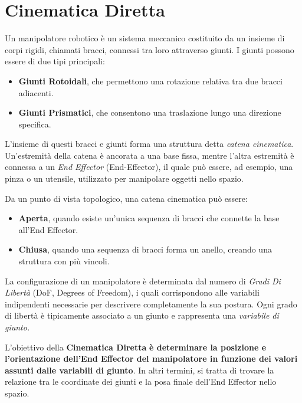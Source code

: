 \documentclass[11pt, a4paper]{report}
\begin{document}
\newpage
\section{Cinematica Diretta}
Un manipolatore robotico è un sistema meccanico costituito da un insieme di corpi rigidi, chiamati bracci, connessi tra loro attraverso giunti. I giunti possono essere di due tipi principali:
\begin{itemize}
    \item \textbf{Giunti Rotoidali}, che permettono una rotazione relativa tra due bracci adiacenti.
    \item \textbf{Giunti Prismatici}, che consentono una traslazione lungo una direzione specifica.
\end{itemize}
L'insieme di questi bracci e giunti forma una struttura detta \emph{catena cinematica}. Un'estremità della catena è ancorata a una base fissa, mentre l'altra estremità è connessa a un \emph{End Effector} (End-Effector), il quale può essere, ad esempio, una pinza o un utensile, utilizzato per manipolare oggetti nello spazio.

Da un punto di vista topologico, una catena cinematica può essere:
\begin{itemize}
    \item \textbf{Aperta}, quando esiste un'unica sequenza di bracci che connette la base all'End Effector.
    \item \textbf{Chiusa}, quando una sequenza di bracci forma un anello, creando una struttura con più vincoli.
\end{itemize}

La configurazione di un manipolatore è determinata dal numero di \emph{Gradi Di Libertà} (DoF, Degrees of Freedom), i quali corrispondono alle variabili indipendenti necessarie per descrivere completamente la sua postura. Ogni grado di libertà è tipicamente associato a un giunto e rappresenta una \textit{variabile di giunto.}

L'obiettivo della \textbf{Cinematica Diretta} \textbf{è determinare la posizione e l'orientazione dell'End Effector del manipolatore in funzione dei valori assunti dalle variabili di giunto}. In altri termini, si tratta di trovare la relazione tra le coordinate dei giunti e la posa finale dell'End Effector nello spazio.
\end{document}

